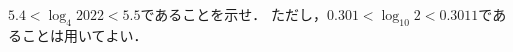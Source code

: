 \documentclass[../../main.tex]{subfiles}
\begin{document}
$5.4<\log_4 2022<5.5$であることを示せ．
ただし，$0.301<\log_{10}2<0.3011$であることは用いてよい．
\end{document}

